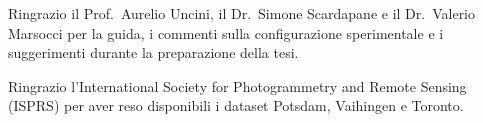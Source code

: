 \begin{acknowledgments}
Ringrazio il Prof.\ Aurelio Uncini, il Dr.\ Simone Scardapane e il Dr.\ Valerio Marsocci per la
guida, i commenti sulla configurazione sperimentale e i suggerimenti durante la preparazione
della tesi.

Ringrazio l'International Society for Photogrammetry and Remote Sensing (ISPRS) per aver reso
disponibili i dataset Potsdam, Vaihingen e Toronto.

\end{acknowledgments}
